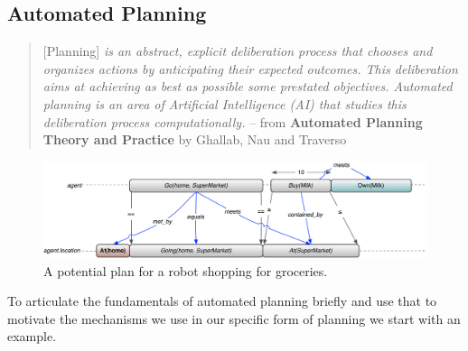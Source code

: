 \subsection{Automated Planning}
\label{sec:planningfound}

{\scriptsize
  \begin{quote}
[Planning] \emph{is an abstract, explicit deliberation process that chooses and
organizes actions by anticipating their expected outcomes. This
deliberation aims at achieving as best as possible some prestated
objectives. Automated planning is an area of Artificial Intelligence
(AI) that studies this deliberation process computationally.} -- from
\textbf{Automated Planning Theory and Practice} by Ghallab, Nau and
Traverso \cite{ghallab04} 
\end{quote}
}

\begin{figure}[b]
\centering
  \includegraphics[scale=0.35]{figs/shopping_europa.pdf}
  \caption{\small A potential plan for a robot shopping for groceries.}
\label{fig:shop:shopping}
\end{figure}

To articulate the fundamentals of automated planning briefly and use
that to motivate the mechanisms we use in our specific form of
planning we start with an example.

